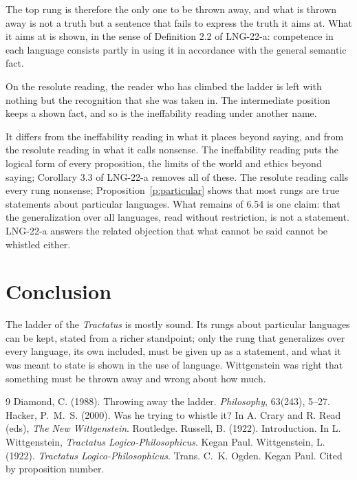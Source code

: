 \documentclass{situationist-preprint}
\begin{document}
The top rung is therefore the only one to be thrown away, and what is thrown away is not a truth but a sentence that fails to express the truth it aims at. What it aims at is shown, in the sense of Definition 2.2 of LNG-22-a: competence in each language consists partly in using it in accordance with the general semantic fact.

\begin{objection}
On the resolute reading, the reader who has climbed the ladder is left with nothing but the recognition that she was taken in. The intermediate position keeps a shown fact, and so is the ineffability reading under another name.
\end{objection}

\begin{reply}
It differs from the ineffability reading in what it places beyond saying, and from the resolute reading in what it calls nonsense. The ineffability reading puts the logical form of every proposition, the limits of the world and ethics beyond saying; Corollary 3.3 of LNG-22-a removes all of these. The resolute reading calls every rung nonsense; Proposition~\ref{p:particular} shows that most rungs are true statements about particular languages. What remains of 6.54 is one claim: that the generalization over all languages, read without restriction, is not a statement. LNG-22-a answers the related objection that what cannot be said cannot be whistled either.
\end{reply}

\section{Conclusion}

The ladder of the \emph{Tractatus} is mostly sound. Its rungs about particular languages can be kept, stated from a richer standpoint; only the rung that generalizes over every language, its own included, must be given up as a statement, and what it was meant to state is shown in the use of language. Wittgenstein was right that something must be thrown away and wrong about how much.

\begin{thebibliography}{9}\small
{} Diamond, C. (1988). Throwing away the ladder. \emph{Philosophy}, 63(243), 5--27.
 Hacker, P.~M.~S. (2000). Was he trying to whistle it? In A. Crary and R. Read (eds), \emph{The New Wittgenstein}. Routledge.
 Russell, B. (1922). Introduction. In L. Wittgenstein, \emph{Tractatus Logico-Philosophicus}. Kegan Paul.
 Wittgenstein, L. (1922). \emph{Tractatus Logico-Philosophicus}. Trans. C.~K. Ogden. Kegan Paul. Cited by proposition number.
\end{thebibliography}
\end{document}
